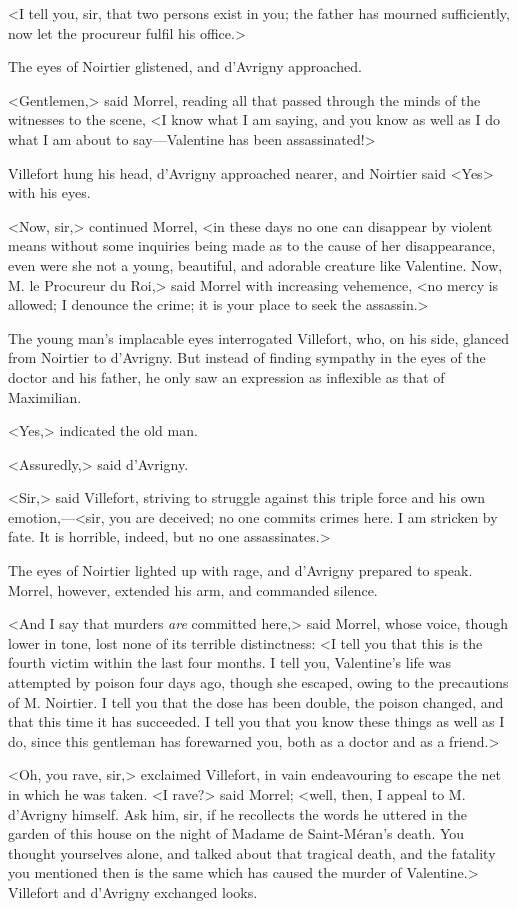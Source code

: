  <I tell you, sir, that two persons exist in you; the father has mourned sufficiently, now let the procureur fulfil his office.> 

 The eyes of Noirtier glistened, and d'Avrigny approached. 

 <Gentlemen,> said Morrel, reading all that passed through the minds of the witnesses to the scene, <I know what I am saying, and you know as well as I do what I am about to say—Valentine has been assassinated!> 

 Villefort hung his head, d'Avrigny approached nearer, and Noirtier said <Yes> with his eyes. 

 <Now, sir,> continued Morrel, <in these days no one can disappear by violent means without some inquiries being made as to the cause of her disappearance, even were she not a young, beautiful, and adorable creature like Valentine. Now, M. le Procureur du Roi,> said Morrel with increasing vehemence, <no mercy is allowed; I denounce the crime; it is your place to seek the assassin.> 

 The young man's implacable eyes interrogated Villefort, who, on his side, glanced from Noirtier to d'Avrigny. But instead of finding sympathy in the eyes of the doctor and his father, he only saw an expression as inflexible as that of Maximilian. 

 <Yes,> indicated the old man. 

 <Assuredly,> said d'Avrigny. 

 <Sir,> said Villefort, striving to struggle against this triple force and his own emotion,—<sir, you are deceived; no one commits crimes here. I am stricken by fate. It is horrible, indeed, but no one assassinates.> 

 The eyes of Noirtier lighted up with rage, and d'Avrigny prepared to speak. Morrel, however, extended his arm, and commanded silence. 

 <And I say that murders \textit{are} committed here,> said Morrel, whose voice, though lower in tone, lost none of its terrible distinctness: <I tell you that this is the fourth victim within the last four months. I tell you, Valentine's life was attempted by poison four days ago, though she escaped, owing to the precautions of M. Noirtier. I tell you that the dose has been double, the poison changed, and that this time it has succeeded. I tell you that you know these things as well as I do, since this gentleman has forewarned you, both as a doctor and as a friend.> 

 <Oh, you rave, sir,> exclaimed Villefort, in vain endeavouring to escape the net in which he was taken.  <I rave?> said Morrel; <well, then, I appeal to M. d'Avrigny himself. Ask him, sir, if he recollects the words he uttered in the garden of this house on the night of Madame de Saint-Méran's death. You thought yourselves alone, and talked about that tragical death, and the fatality you mentioned then is the same which has caused the murder of Valentine.> Villefort and d'Avrigny exchanged looks. 

